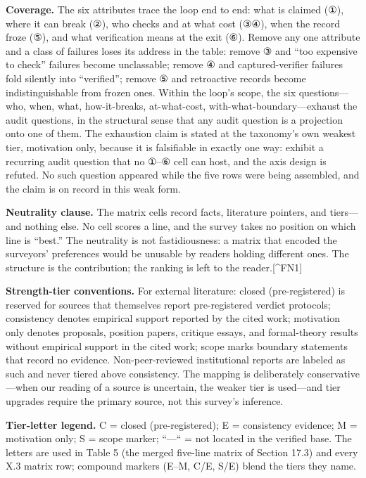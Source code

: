 \documentclass[11pt]{article}
\begin{document}
\noindent \textbf{Coverage.} The six attributes trace the loop end to end: what is claimed (①), where it can break (②), who checks and at what cost (③④), when the record froze (⑤), and what verification means at the exit (⑥). Remove any one attribute and a class of failures loses its address in the table: remove ③ and ``too expensive to check'' failures become unclassable; remove ④ and captured-verifier failures fold silently into ``verified''; remove ⑤ and retroactive records become indistinguishable from frozen ones. Within the loop's scope, the six questions—who, when, what, how-it-breaks, at-what-cost, with-what-boundary—exhaust the audit questions, in the structural sense that any audit question is a projection onto one of them. The exhaustion claim is stated at the taxonomy's own weakest tier, motivation only, because it is falsifiable in exactly one way: exhibit a recurring audit question that no ①–⑥ cell can host, and the axis design is refuted. No such question appeared while the five rows were being assembled, and the claim is on record in this weak form.\par
\noindent \textbf{Neutrality clause.} The matrix cells record facts, literature pointers, and tiers—and nothing else. No cell scores a line, and the survey takes no position on which line is ``best.'' The neutrality is not fastidiousness: a matrix that encoded the surveyors' preferences would be unusable by readers holding different ones. The structure is the contribution; the ranking is left to the reader.[\textasciicircum{}FN1]\par
\noindent \textbf{Strength-tier conventions.} For external literature: closed (pre-registered) is reserved for sources that themselves report pre-registered verdict protocols; consistency denotes empirical support reported by the cited work; motivation only denotes proposals, position papers, critique essays, and formal-theory results without empirical support in the cited work; scope marks boundary statements that record no evidence. Non-peer-reviewed institutional reports are labeled as such and never tiered above consistency. The mapping is deliberately conservative—when our reading of a source is uncertain, the weaker tier is used—and tier upgrades require the primary source, not this survey's inference.\par
\noindent \textbf{Tier-letter legend.} C = closed (pre-registered); E = consistency evidence; M = motivation only; S = scope marker; ``—`` = not located in the verified base. The letters are used in Table 5 (the merged five-line matrix of Section 17.3) and every X.3 matrix row; compound markers (E–M, C/E, S/E) blend the tiers they name.\par
\end{document}
